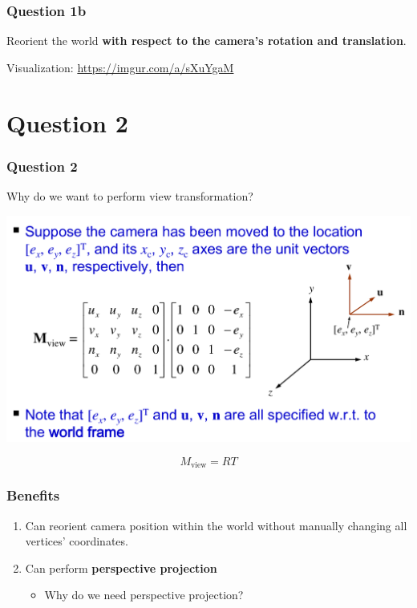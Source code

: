 \documentclass{beamer}
\begin{document}
\begin{frame}
    \frametitle{Question 1b}

    Reorient the world \textbf{with respect to the camera's rotation and translation}.

    \vspace{1em}

    Visualization: \url{https://imgur.com/a/sXuYgaM}
    
\end{frame}

\section{Question 2}

\begin{frame}
    \frametitle{Question 2}

    Why do we want to perform view transformation?
    \begin{center}
        \includegraphics[scale=0.15]{images/matrix-view_transform.png}
    \end{center}

    \begin{tcolorbox}
        \begin{equation*}
            M_\text{view} = R T
        \end{equation*}
    \end{tcolorbox}

\end{frame}

\begin{frame}
    \frametitle{Benefits}

    \begin{enumerate}
        \item Can reorient camera position within the world without manually changing all vertices' coordinates.
        \item Can perform \textbf{perspective projection}
        \begin{itemize}
            \item Why do we need perspective projection?
        \end{itemize}
    \end{enumerate}

\end{frame}
\end{document}
